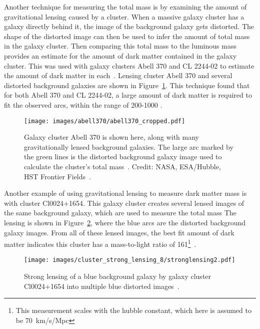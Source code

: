 Another technique for measuring the total mass is by examining the amount of gravitational lensing caused by a cluster.
When a massive galaxy cluster has a galaxy directly behind it, the image of the background galaxy gets distorted.
The shape of the distorted image can then be used to infer the amount of total mass in the galaxy cluster.
Then comparing this total mass to the luminous mass provides an estimate for the amount of dark matter contained in the galaxy cluster.
This was used with galaxy clusters Abell 370 and CL 2244-02 to estimate the amount of dark matter in each~\cite{cluster_lensing}.
Lensing cluster Abell 370 and several distorted background galaxies are shown in Figure~\ref{fig:abell370}.
This technique found that for both Abell 370 and CL 2244-02, a large amount of dark matter is required to fit the observed arcs, within the range of 200-1000 \MLsol.
    
\begin{figure}
  \centering
  \texttt{[image: images/abell370/abell370\_cropped.pdf]}
  \caption[Gravitational Lensing in Abell 370]{
    Galaxy cluster Abell 370 is shown here, along with many gravitationally lensed background galaxies.
    The large arc marked by the green lines is the distorted background galaxy image used to calculate the cluster's total mass~\cite{cluster_lensing}.
    Credit: NASA, ESA/Hubble, HST Frontier Fields~\cite{abell370_hubble}.
  }
  \label{fig:abell370}
\end{figure}
    
Another example of using gravitational lensing to measure dark matter mass is with cluster Cl0024+1654.
This galaxy cluster creates several lensed images of the same background galaxy, which are used to measure the total mass
The lensing is shown in Figure~\ref{fig:stronglens}, where the blue arcs are the distorted background galaxy images.
From all of these lensed images, the best fit amount of dark matter indicates this cluster has a mass-to-light ratio of \SI{161}{}\MLsol{}\footnote[3]{This measurement scales with the hubble constant, which here is assumed to be \SI{70}{km/s/Mpc}}~\cite{cluster_strong_lensing_1996, cluster_strong_lensing_1998, cluster_strong_lensing_2010}.
    
\begin{figure}
  \centering
  \texttt{[image: images/cluster\_strong\_lensing\_8/stronglensing2.pdf]}
  \caption[Gravitational Lensing in Cl0024+1654]{
    Strong lensing of a blue background galaxy by galaxy cluster Cl0024+1654 into multiple blue distorted images~\cite{cluster_strong_lensing_1996}.
  }
  \label{fig:stronglens}
\end{figure}
    
